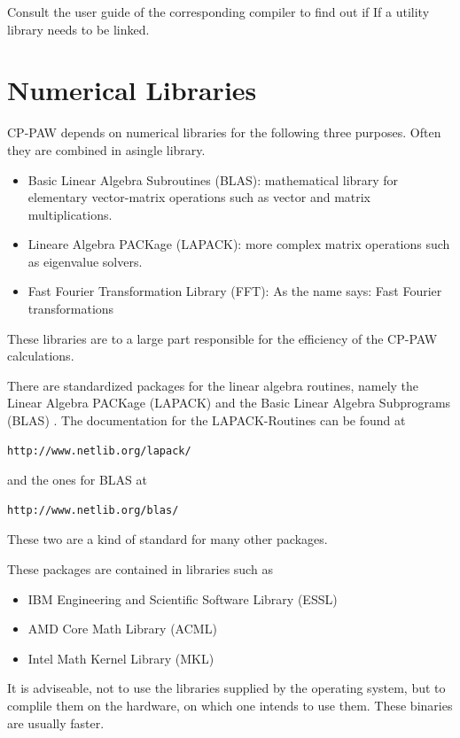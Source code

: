 \documentclass[a4paper,10pt]{report}
\begin{document}
Consult the user guide of the corresponding compiler to find out if
If a utility library needs to be linked.

\newpage
\section{Numerical Libraries}
\label{sec:libs}

CP-PAW depends on numerical libraries for the following three
purposes. Often they are combined in asingle library.
\begin{itemize}
\item Basic Linear Algebra Subroutines (BLAS):
mathematical library for elementary vector-matrix operations such as
vector and matrix multiplications.
\item Lineare Algebra PACKage (LAPACK): more complex
matrix operations such as eigenvalue solvers.
\item Fast Fourier Transformation Library (FFT):
As the name says: Fast Fourier transformations
\end{itemize}
These libraries are to a large part responsible for the efficiency of
the CP-PAW calculations.

There are standardized packages for the linear algebra routines,
namely the Linear Algebra PACKage (LAPACK) and the Basic Linear
Algebra Subprograms (BLAS) . The documentation for the LAPACK-Routines
can be found at
\begin{verbatim}
http://www.netlib.org/lapack/ 
\end{verbatim}
and the ones for BLAS at
\begin{verbatim}
http://www.netlib.org/blas/
\end{verbatim}
These two are a kind of standard for many other packages.

These packages are contained in libraries
such as
\begin{itemize}
\item IBM Engineering and Scientific Software Library (ESSL)
\item AMD Core Math Library (ACML)
\item Intel Math Kernel Library (MKL)
\end{itemize}

It is adviseable, not to use the libraries supplied by the operating system, but to complile them 
on the hardware, on which one intends to use them. These binaries are usually faster.
\end{document}
